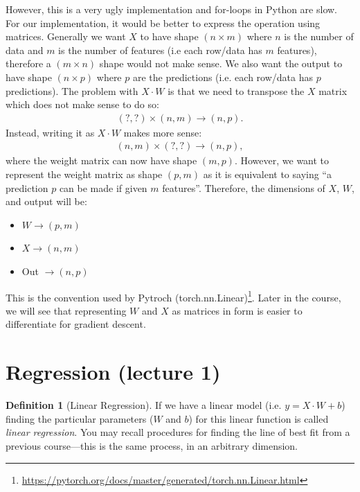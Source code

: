 \documentclass[11pt]{article}
\numberwithin{equation}{section}
\theoremstyle{definition}%
\newtheorem{definition}{Definition}[section]%
\begin{document}
However, this is a very ugly implementation and for-loops in Python are slow. For our implementation, it would be better to express the operation using matrices. Generally we want $X$ to have shape $(n \times m)$ where $n$ is the number of data and $m$ is the number of features (i.e each row/data has $m$ features), therefore a $(m \times n)$ shape would not make sense. We also want the output to have shape $(n \times p)$ where $p$ are the predictions (i.e. each row/data has $p$ predictions). The problem with $X \cdot W$ is that we need to transpose the $X$ matrix which does not make sense to do so:
\begin{align}
    (?, ?) \times (n, m) \rightarrow (n, p).
\end{align}
Instead, writing it as $X \cdot W$ makes more sense:
\begin{align}
    (n,m) \times (?,?) \rightarrow (n,p),
\end{align}
where the weight matrix can now have shape $(m,p)$. However, we want to represent the weight matrix as shape $(p,m)$ as it is equivalent to saying ``a prediction $p$ can be made if given $m$ features''. Therefore, the dimensions of $X$, $W$, and output will be:

\begin{itemize}
    \item {$W \rightarrow (p,m)$}
    \item {$X \rightarrow (n,m)$}
    \item {Out $\rightarrow (n,p)$}
\end{itemize}

This is the convention used by Pytroch (torch.nn.Linear)\footnote{\url{https://pytorch.org/docs/master/generated/torch.nn.Linear.html}}. Later in the course, we will see that representing $W$ and $X$ as matrices in form is easier to differentiate for gradient descent.

\section{Regression (lecture 1)}
\begin{definition}[Linear Regression]

If we have a linear model (i.e. $y= X \cdot W + b$) finding the particular parameters ($W$ and $b$) for this linear function is called \emph{linear regression}. You may recall procedures for finding the line of best fit from a previous course---this is the same process, in an arbitrary dimension.
\end{definition}
\end{document}
